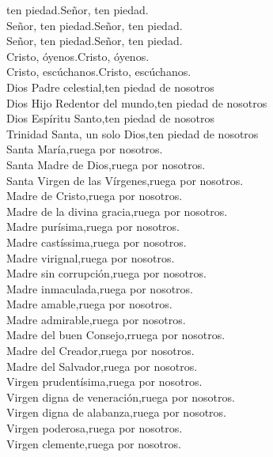 ten piedad.{\hfill}Señor, ten piedad.\\
Señor, ten piedad.{\hfill}Señor, ten piedad.\\
Señor, ten piedad.{\hfill}Señor, ten piedad.\\
Cristo, óyenos.{\hfill}Cristo, óyenos.\\
Cristo, escúchanos.{\hfill}Cristo, escúchanos.\\
Dios Padre celestial,{\hfill}ten piedad de nosotros\\
Dios Hijo Redentor del mundo,{\hfill}ten piedad de nosotros\\
Dios Espíritu Santo,{\hfill}ten piedad de nosotros\\
Trinidad Santa, un solo Dios,{\hfill}ten piedad de nosotros\\
Santa María,{\hfill}ruega por nosotros.\\
Santa Madre de Dios,{\hfill}ruega por nosotros.\\
Santa Virgen de las Vírgenes,{\hfill}ruega por nosotros.\\
Madre de Cristo,{\hfill}ruega por nosotros.\\
Madre de la divina gracia,{\hfill}ruega por nosotros.\\
Madre purísima,{\hfill}ruega por nosotros.\\
Madre castíssima,{\hfill}ruega por nosotros.\\
Madre virignal,{\hfill}ruega por nosotros.\\
Madre sin corrupción,{\hfill}ruega por nosotros.\\
Madre inmaculada,{\hfill}ruega por nosotros.\\
Madre amable,{\hfill}ruega por nosotros.\\
Madre admirable,{\hfill}ruega por nosotros.\\
Madre del buen Consejo,{\hfill}rruega por nosotros.\\
Madre del Creador,{\hfill}ruega por nosotros.\\
Madre del Salvador,{\hfill}ruega por nosotros.\\
Virgen prudentísima,{\hfill}ruega por nosotros.\\
Virgen digna de veneración,{\hfill}ruega por nosotros.\\
Virgen digna de alabanza,{\hfill}ruega por nosotros.\\
Virgen poderosa,{\hfill}ruega por nosotros.\\
Virgen clemente,{\hfill}ruega por nosotros.\\
